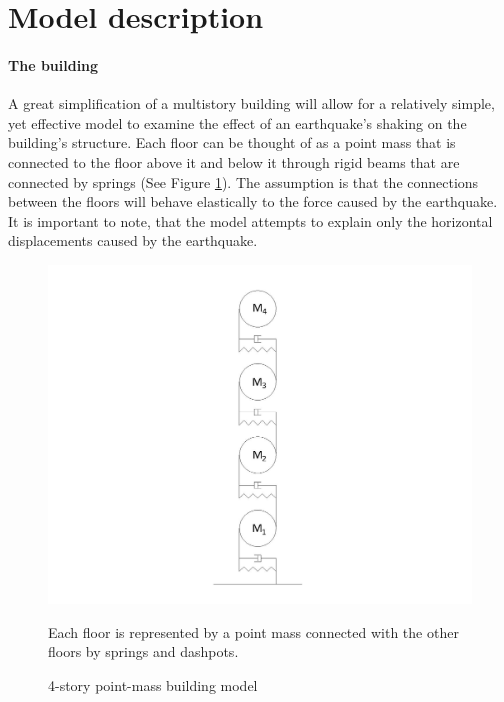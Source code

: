 \documentclass{article}
\begin{document}
	\section{Model description}

		 	\paragraph{The building} A great simplification of a multistory building will allow for a relatively simple, yet effective model to examine the effect of an earthquake's shaking on the building's structure. Each floor can be thought of as a point mass that is connected to the floor above it and below it through rigid beams that are connected by springs (See Figure \ref{fig1}). The assumption is that the connections between the floors will behave elastically to the force caused by the earthquake. It is important to note, that the model attempts to explain only the horizontal displacements caused by the earthquake.
				
				\begin{figure}[h!]
   					\centering
   					\includegraphics[width=120mm]{pictures/SPRINGS-Model1.jpg}
					\centering
   					\caption{4-story point-mass building model}
					\medskip
					\small
					Each floor is represented by a point mass connected with the other floors by springs and dashpots.
				           \label{fig1}
  				\end{figure}
\end{document}
